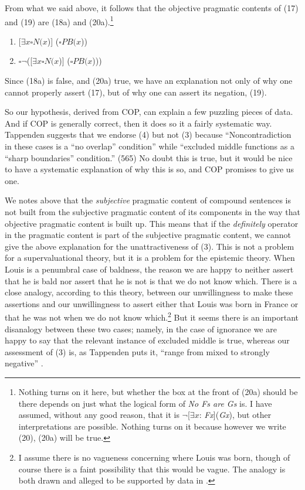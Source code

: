 \noindent From what we said above, it follows that the objective pragmatic contents of (17) and (19) are (18a) and (20a).\footnote{Nothing turns on it here, but whether the box at the front of (20a) should be there depends on just what the logical form of \textit{No Fs are Gs} is. I have assumed, without any good reason, that it is \(\neg\)[\(\exists x\): \textit{Fx}](\textit{Gx}), but other interpretations are possible. Nothing turns on it because however we write (20), (20a) will be true.}

\begin{enumerate}
\renewcommand{\labelenumi}{(\arabic{enumi}a)}
\setcounter{enumi}{17}
\item {}[\(\exists x \square N(x\))] (\(\square PB(x\)))
\setcounter{enumi}{19}
\item \(\square \neg\)([\(\exists x \square N(x\))] (\(\square PB(x\))))
\end{enumerate}

\noindent Since (18a) is false, and (20a) true, we have an explanation not only of why one cannot properly assert (17), but of why one can assert its negation, (19).

So our hypothesis, derived from COP, can explain a few puzzling pieces of data. And if COP is generally correct, then it does so it a fairly systematic way. Tappenden suggests that we endorse (4) but not (3) because ``Noncontradiction in these cases is a ``no overlap'' condition'' while ``excluded middle functions as a ``sharp boundaries'' condition.'' (565) No doubt this is true, but it would be nice to have a systematic explanation of why this is so, and COP promises to give us one.

We notes above that the \textit{subjective} pragmatic content of compound sentences is not built from the subjective pragmatic content of its components in the way that objective pragmatic content is built up. This means that if the \textit{definitely} operator in the pragmatic content is part of the subjective pragmatic content, we cannot give the above explanation for the unattractiveness of (3). This is not a problem for a supervaluational theory, but it is a problem for the epistemic theory. When Louis is a penumbral case of baldness, the reason we are happy to neither assert that he is bald nor assert that he is not is that we do not know which. There is a close analogy, according to this theory, between our unwillingness to make these assertions and our unwillingness to assert either that Louis was born in France or that he was not when we do not know which.\footnote{I assume there is no vagueness concerning where Louis was born, though of course there is a faint possibility that this would be vague. The analogy is both drawn and alleged to be supported by data in \citet{Bonini1999-BONOTP}.} But it seems there is an important disanalogy between these two cases; namely, in the case of ignorance we are happy to say that the relevant instance of excluded middle is true, whereas our assessment of (3) is, as Tappenden puts it, ``range from mixed to strongly negative'' \citeyearpar[565]{Tappenden1993}.

